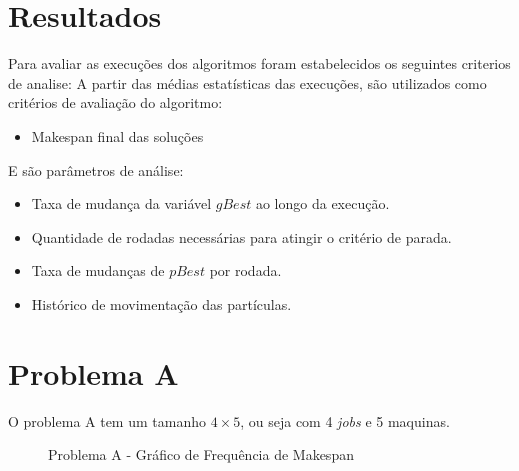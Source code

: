\section{Resultados}
Para avaliar as execuções dos algoritmos foram estabelecidos os seguintes criterios de analise:
A partir das médias estatísticas das execuções, são utilizados como critérios de avaliação do algoritmo:
\begin{itemize}
\item Makespan final das soluções
\end{itemize}

\noindent E são parâmetros de análise:
\begin{itemize}
\item Taxa de mudança da variável $gBest$ ao longo da execução.
\item Quantidade de rodadas necessárias para atingir o critério de parada.
\item Taxa de mudanças de $pBest$ por rodada.
\item Histórico de movimentação das partículas.
\end{itemize}
%

\section{Problema A}

O problema A tem um tamanho $4 \times 5$, ou seja com 4 \textit{jobs} e 5 maquinas.\\
\begin{figure}
    \caption{Problema A - Gráfico de Frequência de Makespan}
    \label{fig:plobA-freq-mk}
    \begin{minipage}{.5\linewidth}
        \centering
        \subfloat[]{
            \label{plobA-freq-mk:a}
            \resizebox{\linewidth}{!}{}
        }
    \end{minipage}%
    \begin{minipage}{.5\linewidth}
        \centering
        \subfloat[]{
            \label{plobA-freq-mk:b}
            \resizebox{\linewidth}{!}{}
        }
    \end{minipage}\par\medskip
      \centering
      \subfloat[]{
        \label{plobA-freq-mk:c}
        \resizebox{.5\linewidth}{!}{}
      }
\end{figure}


